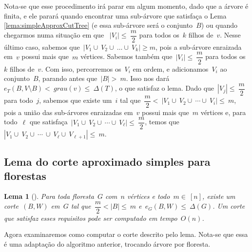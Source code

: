 \documentclass[a4paper,12pt]{article}
\newtheorem{lem}{Lema}
\begin{document}
	Nota-se que esse procedimento irá parar em algum momento, dado que a árvore 
	é finita, e ele parará quando encontrar
	uma sub-árvore que satisfaça o Lema 
	\ref{lema:simpleApproxCutTree}
	(e essa sub-árvore será o conjunto~$B$) 
	ou quando chegarmos numa situação em que  
	~$|V_i|\le~\dfrac{m}{2}$ para todos os~$k$ filhos de~$v$.
	Nesse último caso, sabemos que~$|V_1\cup~V_2\cup~\ldots \cup~V_k|\ge m$, pois
	a sub-árvore enraizada em~$v$ possui mais que~$m$ vértices. 
	Sabemos também que~$|V_i|\le~\dfrac{m}{2}$ para todos os~$k$ filhos de~$v$. 
	Com isso, percorremos os~$V_i$ em ordem, e 
	adicionamos~$V_i$ ao conjunto~$B$, parando antes que~$|B| >~m$. Isso nos 
	dará~$e_T(B,V\setminus B) <~grau(v)\le~\Delta(T)$, o que satisfaz o lema.
	Dado que~$|V_j|\le~\dfrac{m}{2}$ para todo~$j$,
	sabemos que existe um~$i$ tal 
	que~$\dfrac{m}{2} <~|V_1 \cup~V_2 \cup~\cdots \cup~V_i| \le~m$, pois
	a união das sub-árvores
	enraizadas em~$v$ possui mais que~$m$ vértices e, para todo~$\ell$ que 
	satisfaça~$|V_1\cup~V_2\cup~\cdots\cup~V_\ell|\le~\dfrac{m}{2}$, temos 
	que~$|V_1\cup~V_2\cup~\cdots~\cup~V_\ell\cup~V_{\ell+1}|\le~m$.


\bigskip
\bigskip
\bigskip


\subsection{Lema do corte aproximado simples para florestas}

\begin{lem}[{\cite[Lemma 2]{Schmidt15}}]
\label{lema:simpleApproxCutForest}
	Para toda floresta~$G$ com~$n$ vértices e todo~$m \in~[n]$,
	existe um corte~$(B,W)$ em~$G$ tal 
	que~$\dfrac{m}{2} <|B| \le~m$ e~$e_G(B,W) \le~\Delta(G)$.
	Um corte que satisfaz esses requisitos pode ser computado em
	tempo~$O(n)$.
\end{lem}

\bigskip

Agora examinaremos como computar o corte descrito pelo lema.
Nota-se que essa é uma adaptação do algoritmo anterior, 
trocando árvore por floresta.

\medskip
\medskip
\end{document}
